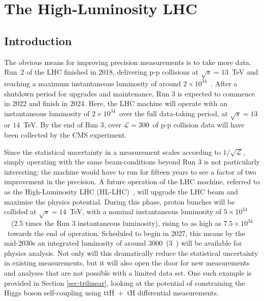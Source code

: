 \chapter{The High-Luminosity LHC}
\label{chap:hllhc}

\section{Introduction}
The obvious means for improving precision measurements is to take more data. Run~2 of the LHC finished in 2018, delivering p-p collisions at $\sqrt{s}=13$~TeV and reaching a maximum instantaneous luminosity of around $2\times10^{34}$~\lumi. After a shutdown period for upgrades and maintenance, Run 3 is expected to commence in 2022 and finish in 2024. Here, the LHC machine will operate with an instantaneous luminosity of $2\times10^{34}$~\lumi over the full data-taking period, at $\sqrt{s}=13$ or $14$~TeV. By the end of Run 3, over $\mathcal{L}=300$~\fbinv of p-p collision data will have been collected by the CMS experiment.

Since the statistical uncertainty in a measurement scales according to $1/\sqrt{\mathcal{L}}$, simply operating with the same beam-conditions beyond Run 3 is not particularly interesting; the machine would have to run for fifteen years to see a factor of two improvement in the precision. A future operation of the LHC machine, referred to as the High-Luminosity LHC (HL-LHC)~\cite{ApollinariG.:2017ojx}, will upgrade the LHC beam and maximise the physics potential. During this phase, proton bunches will be collided at $\sqrt{s}=14$~TeV, with a nominal instantaneous luminosity of $5\times10^{34}$~\lumi~(2.5 times the Run 3 instantaneous luminosity), rising to as high as $7.5\times10^{34}$~\lumi towards the end of operation. Scheduled to begin in 2027, this means by the mid-2030s an integrated luminosity of around 3000~\fbinv (3~\abinv) will be available for physics analysis. Not only will this dramatically reduce the statistical uncertainty in existing measurements, but it will also open the door for new measurements and analyses that are not possible with a limited data set. One such example is provided in Section \ref{sec:trilinear}, looking at the potential of constraining the Higgs boson self-coupling using ttH~+~tH differential measurements.

